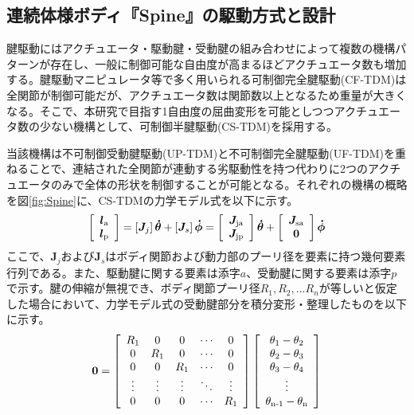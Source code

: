 \documentclass{jarticle}
\begin{document}
\subsection{連続体様ボディ『Spine』の駆動方式と設計}
腱駆動にはアクチュエータ・駆動腱・受動腱の組み合わせによって複数の機構パターンが存在し、一般に制御可能な自由度が高まるほどアクチュエータ数も増加する。腱駆動マニピュレータ等で多く用いられる可制御完全腱駆動(CF-TDM)は全関節が制御可能だが、アクチュエータ数は関節数以上となるため重量が大きくなる。そこで、本研究で目指す1自由度の屈曲変形を可能としつつアクチュエータ数の少ない機構として、可制御半腱駆動(CS-TDM)を採用する\cite{ozawa}。

当該機構は不可制御受動腱駆動(UP-TDM)と不可制御完全腱駆動(UF-TDM)を重ねることで、連結された全関節が連動する劣駆動性を持つ代わりに2つのアクチュエータのみで全体の形状を制御することが可能となる。それぞれの機構の概略を図\ref{fig:Spine}に、CS-TDMの力学モデル式を以下に示す。
\begin{equation}
  \left[ \begin{array}{c} \bm{l}_\text{a}\\ \bm{l}_\text{p} \end{array} \right] = \left[ \bm{J}_j \right] \bm{\dot{\theta}} + \left[ \bm{J}_s \right] \bm{\dot{\phi}} = \left[ \begin{array}{c} \bm{J}_\text{ja}\\ \bm{J}_\text{jp} \end{array} \right]  \bm{\dot{\theta}} + \left[ \begin{array}{c} \bm{J}_\text{sa}\\ \bm{0} \end{array} \right] \bm{\dot{\phi}}
  \vspace{-2mm}
  \label{equ:lmatrix}
\end{equation}
ここで、$\bm{J}_j$および$\bm{J}_s$はボディ関節および動力部のプーリ径を要素に持つ幾何要素行列である。また、駆動腱に関する要素は添字$a$、受動腱に関する要素は添字$p$で示す。腱の伸縮が無視でき、ボディ関節プーリ径$R_1, R_2, ...R_n$が等しいと仮定した場合において、力学モデル式の受動腱部分を積分変形・整理したものを以下に示す。
\begin{equation}
  \bm{0} = \left[ \begin{array}{ccccc} R_1 & 0 & 0 & \cdots &0 \\
      0 & R_1 & 0 & \cdots & 0 \\
      0 & 0 & R_1 & \cdots & 0 \\
      \vdots & \vdots & \vdots & \ddots & \vdots \\
      0 & 0 & 0 & \cdots & R_1
  \end{array} \right]
  \left[ \begin{array}{c} \theta_1 - \theta_2 \\
      \theta_2 - \theta_3 \\
      \theta_3 - \theta_4 \\
      \vdots \\
      \theta_\text{n-1}-\theta_\text{n}
  \end{array} \right]
  \label{passivematrixshort}
  \vspace{-2mm}
\end{equation}
\end{document}

